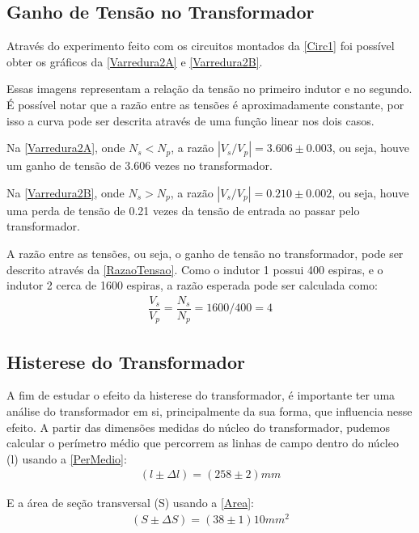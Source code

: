 \documentclass[11pt,a4paper]{article}
\begin{document}
    \subsection{Ganho de Tensão no Transformador}
    
    
    Através do experimento feito com os circuitos montados da \cref{Circ1} foi possível obter os gráficos da \cref{Varredura2A} e \cref{Varredura2B}.
    
    Essas imagens representam a relação da tensão no primeiro indutor e no segundo. 
    É possível notar que a razão entre as tensões é aproximadamente constante, por isso a curva pode ser descrita através de uma função linear nos dois casos.
    
    Na \cref{Varredura2A}, onde $N_s < N_p$, a razão $|V_s / V_p|=3.606 \pm 0.003$, ou seja, houve um ganho de tensão de 3.606 vezes no transformador.
    
    Na \cref{Varredura2B}, onde $N_s > N_p$, a razão $|V_s / V_p|=0.210 \pm 0.002$, ou seja, houve uma perda de tensão de 0.21 vezes da tensão de entrada ao passar pelo transformador.
    
    A razão entre as tensões, ou seja, o ganho de tensão no transformador, pode ser descrito através da \cref{RazaoTensao}. Como o indutor 1 possui 400 espiras, e o indutor 2 cerca de 1600 espiras, a razão esperada pode ser calculada como:
    \begin{gather*}
        \dfrac{V_s}{V_p}=\dfrac{N_s}{N_p}=1600/400=4
    \end{gather*}
    
    
    \subsection{Histerese do Transformador}
    A fim de estudar o efeito da histerese do transformador, é importante ter uma análise do transformador em si, principalmente da sua forma, que influencia nesse efeito. A partir das dimensões medidas do núcleo do transformador, pudemos calcular o perímetro médio que percorrem as linhas de campo dentro do núcleo (l) usando a \cref{PerMedio}:
    \begin{gather*}
        (l \pm \Delta l) = (258 \pm 2)mm
    \end{gather*}
    
    E a área de seção transversal (S) usando a \cref{Area}:
    \begin{gather*}
        (S \pm \Delta S) = (38 \pm 1) 10 mm^2
    \end{gather*}
 
\end{document}
